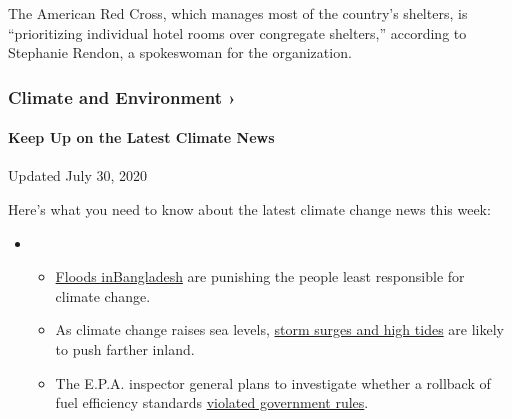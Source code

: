 The American Red Cross, which manages most of the country's shelters, is
``prioritizing individual hotel rooms over congregate shelters,''
according to Stephanie Rendon, a spokeswoman for the organization.

\href{https://www.nytimes3xbfgragh.onion/section/climate?action=click\&pgtype=Article\&state=default\&region=MAIN_CONTENT_1\&context=storylines_keepup}{}

\hypertarget{climate-and-environment-}{%
\subsubsection{Climate and Environment
›}\label{climate-and-environment-}}

\hypertarget{keep-up-on-the-latest-climate-news}{%
\paragraph{Keep Up on the Latest Climate
News}\label{keep-up-on-the-latest-climate-news}}

Updated July 30, 2020

Here's what you need to know about the latest climate change news this
week:

\begin{itemize}
\item
  \begin{itemize}
  \tightlist
  \item
    \href{https://www.nytimes3xbfgragh.onion/2020/07/30/climate/bangladesh-floods.html?action=click\&pgtype=Article\&state=default\&region=MAIN_CONTENT_1\&context=storylines_keepup}{Floods
    in}\href{https://www.nytimes3xbfgragh.onion/2020/07/30/climate/bangladesh-floods.html?action=click\&pgtype=Article\&state=default\&region=MAIN_CONTENT_1\&context=storylines_keepup}{Bangladesh}
    are punishing the people least responsible for climate change.
  \item
    As climate change raises sea levels,
    \href{https://www.nytimes3xbfgragh.onion/2020/07/30/climate/sea-level-inland-floods.html?action=click\&pgtype=Article\&state=default\&region=MAIN_CONTENT_1\&context=storylines_keepup}{storm
    surges and high tides} are likely to push farther inland.
  \item
    The E.P.A. inspector general plans to investigate whether a rollback
    of fuel efficiency standards
    \href{https://www.nytimes3xbfgragh.onion/2020/07/27/climate/trump-fuel-efficiency-rule.html?action=click\&pgtype=Article\&state=default\&region=MAIN_CONTENT_1\&context=storylines_keepup}{violated
    government rules}.
  \end{itemize}
\end{itemize}

